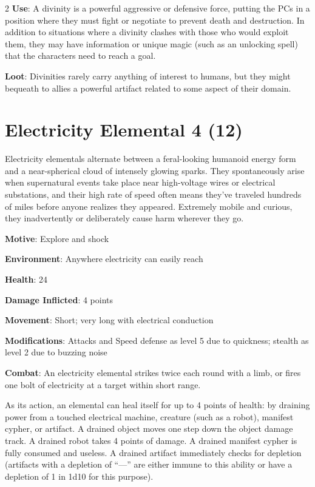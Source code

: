 \begin{multicols}{2}
\textbf{Use}: A divinity is a powerful aggressive or defensive force, putting the PCs in a position where they must fight or negotiate to prevent death and destruction. In addition to situations where a divinity clashes with those who would exploit them, they may have information or unique magic (such as an unlocking spell) that the characters need to reach a goal. 

\textbf{Loot}: Divinities rarely carry anything of interest to humans, but they might bequeath to allies a powerful artifact related to some aspect of their domain.

\section{Electricity Elemental 4 (12)}

Electricity elementals alternate between a feral-looking humanoid energy form and a near-spherical cloud of intensely glowing sparks. They spontaneously arise when supernatural events take place near high-voltage wires or electrical substations, and their high rate of speed often means they’ve traveled hundreds of miles before anyone realizes they appeared. Extremely mobile and curious, they inadvertently or deliberately cause harm wherever they go. 

\textbf{Motive}: Explore and shock 

\textbf{Environment}: Anywhere electricity can easily reach 

\textbf{Health}: 24 

\textbf{Damage Inflicted}: 4 points 

\textbf{Movement}: Short; very long with electrical conduction 

\textbf{Modifications}: Attacks and Speed defense as level 5 due to quickness; stealth as level 2 due to buzzing noise 

\textbf{Combat}: An electricity elemental strikes twice each round with a limb, or fires one bolt of electricity at a target within short range. 

As its action, an elemental can heal itself for up to 4 points of health: by draining power from a touched electrical machine, creature (such as a robot), manifest cypher, or artifact. A drained object moves one step down the object damage track. A drained robot takes 4 points of damage. A drained manifest cypher is fully consumed and useless. A drained artifact immediately checks for depletion (artifacts with a depletion of “—” are either immune to this ability or have a depletion of 1 in 1d10 for this purpose). 


\end{multicols}
